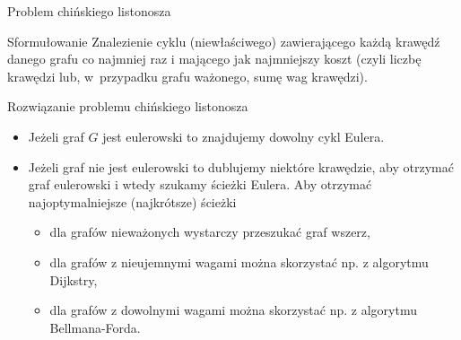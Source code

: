 \documentclass[a4paper,10pt]{beamer}
\begin{document}
\begin{frame}{Problem chińskiego listonosza}
	
	\begin{block}{Sformułowanie}
		Znalezienie cyklu (niewłaściwego) zawierającego każdą krawędź danego grafu co najmniej raz i mającego jak najmniejszy koszt (czyli liczbę krawędzi lub, w~przypadku grafu ważonego, sumę wag krawędzi).
	\end{block}
	
	\begin{block}{Rozwiązanie problemu chińskiego listonosza}
		\begin{itemize}
			\item Jeżeli graf $G$ jest eulerowski to znajdujemy dowolny cykl Eulera.
			\item Jeżeli graf nie jest eulerowski to dublujemy niektóre krawędzie, aby otrzymać graf eulerowski i wtedy szukamy ścieżki Eulera. Aby otrzymać najoptymalniejsze (najkrótsze) ścieżki
			\begin{itemize}
				\item dla grafów nieważonych wystarczy przeszukać graf wszerz,
				\item dla grafów z nieujemnymi wagami można skorzystać np. z algorytmu Dijkstry,
				\item dla grafów z dowolnymi wagami można skorzystać np. z algorytmu Bellmana-Forda.
			\end{itemize}
		\end{itemize}
		
	\end{block}
	
\end{frame}
\end{document}
